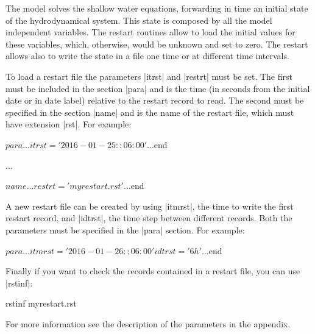 
The model solves the shallow water equations, forwarding in time an
initial state of the hydrodynamical system. This state is composed by all
the model independent variables.  The restart routines allow to load the
initial values for these variables, which, otherwise, would be unknown
and set to zero.  The restart allows also to write the state in a file
one time or at different time intervals.

To load a restart file the parameters |itrst| and |restrt| must be
set. The first must be included in the section |para| and is the time (in
seconds from the initial date or in date label) relative to the restart
record to read.  The second must be specified in the section |name|
and is the name of the restart file, which must have extension |rst|.
For example:

\begin{code}
$para
...
itrst = '2016-01-25::06:00'
...
$end

...

$name
...
restrt = 'myrestart.rst'
...
$end
\end{code}

A new restart file can be created by using |itmrst|, the time to write
the first restart record, and |idtrst|, the time step between different
records. Both the parameters must be specified in the |para| section.
For example:

\begin{code}
$para
...
itmrst = '2016-01-26::06:00'
idtrst = '6h'
...
$end
\end{code}

Finally if you want to check the records contained in a restart file,
you can use |rstinf|:

\begin{code}
    rstinf myrestart.rst
\end{code}


For more information see the description of the parameters in the appendix.

